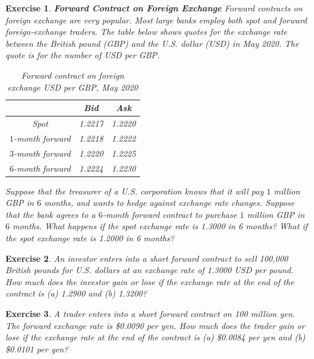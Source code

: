 \documentclass[letterpaper,10pt]{article}
\newtheorem{ex}{Exercise}
\begin{document}
\begin{ex}{\bf Forward Contract on Foreign Exchange}
Forward contracts on foreign exchange are very popular. Most large banks employ both spot and forward foreign-exchange traders.   The table below shows quotes for the exchange rate between the British pound (GBP) and the U.S. dollar (USD) in May 2020. The quote is for the number of USD per GBP.

\begin{center}
\begin{table}[h]
\begin{tabular}{|c|c|c|}\hline
&Bid&Ask\\\hline
Spot & 1.2217&1.2220\\\hline
$1$-month forward & 1.2218&1.2222\\\hline
$3$-month forward & 1.2220&1.2225\\\hline
$6$-month forward & 1.2224&1.2230\\\hline
\end{tabular}
\caption{Forward contract on foreign exchange USD per GBP, May 2020}
\end{table}
\end{center}

\noindent Suppose that the treasurer of a U.S. corporation knows that it will pay $1$ million GBP in $6$ months, and wants to hedge against exchange rate changes.  Suppose that the bank agrees to a $6$-month forward contract to purchase $1$ million GBP in $6$ months.  What happens if the spot exchange rate is 1.3000 in 6 months?  What if the spot exchange rate is 1.2000 in 6 months?

\end{ex}

\begin{ex}
An investor enters into a short forward contract to sell 100,000 British pounds for U.S. dollars at an exchange rate of 1.3000 USD per pound. How much does the investor gain or lose if the exchange rate at the end of the contract is (a) 1.2900 and (b) 1.3200?
\end{ex}


\begin{ex}
A trader enters into a short forward contract on 100 million yen. The forward exchange rate is \$0.0090 per yen. How much does the trader gain or lose if the exchange rate at the end of the contract is (a) \$0.0084 per yen and (b) \$0.0101 per yen?
\end{ex}

\newpage
\end{document}
